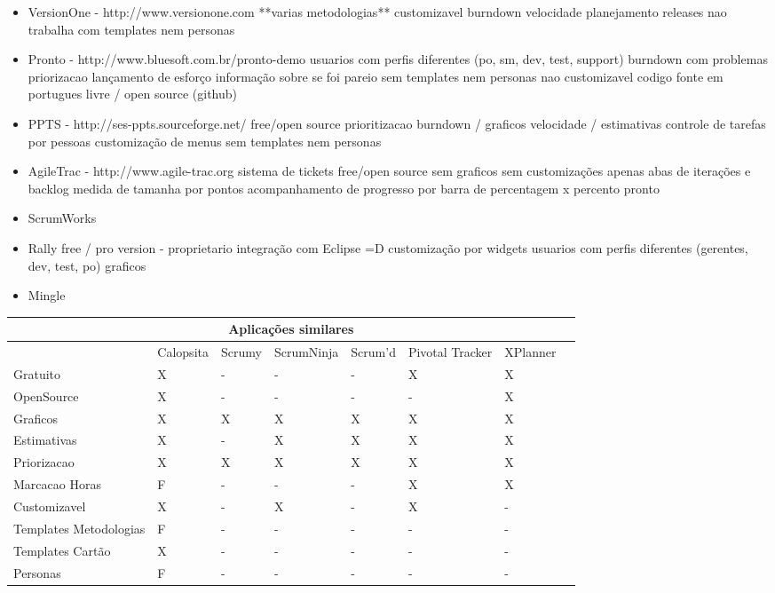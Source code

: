 \begin{itemize}
\item VersionOne - http://www.versionone.com
**varias metodologias**
customizavel
burndown
velocidade
planejamento releases
nao trabalha com templates nem personas

\item Pronto - http://www.bluesoft.com.br/pronto-demo
usuarios com perfis diferentes (po, sm, dev, test, support)
burndown com problemas
priorizacao
lançamento de esforço
informação sobre se foi pareio
sem templates nem personas
nao customizavel
codigo fonte em portugues
livre / open source (github)

\item PPTS - http://ses-ppts.sourceforge.net/
free/open source
prioritizacao
burndown / graficos
velocidade / estimativas
controle de tarefas por pessoas
customização de menus
sem templates nem personas

\item AgileTrac - http://www.agile-trac.org
sistema de tickets
free/open source
sem graficos
sem customizações
apenas abas de iterações e backlog
medida de tamanha por pontos
acompanhamento de progresso por barra de percentagem x percento pronto

\item ScrumWorks

\item Rally
free / pro version - proprietario
integração com Eclipse =D
customização por widgets
usuarios com perfis diferentes (gerentes, dev, test, po)
graficos

\item Mingle

\end{itemize}

\begin{sidewaystable}
	\begin{tabular}{|l|l|l|l|l|l|l|l|}
		\hline
		\multicolumn{8}{|c|}{Aplicações similares} \\
		\hline
		 & Calopsita & Scrumy & ScrumNinja & Scrum'd & Pivotal Tracker & XPlanner & \\
		Gratuito & X & - & - & - & X & X & \\
		OpenSource & X & - & - & - & - & X & \\
		Graficos & X & X & X & X & X & X & \\
		Estimativas & X & - & X & X & X & X & \\
		Priorizacao & X & X & X & X & X & X & \\
		Marcacao Horas & F & - & - & - & X & X & \\
		Customizavel & X & - & X & - & X & - & \\
		Templates Metodologias & F & - & - & - & - & - & \\
		Templates Cartão & X & - & - & - & - & - & \\
		Personas & F & - & - & - & - & - & \\
		\hline
	\end{tabular}
\end{sidewaystable}



